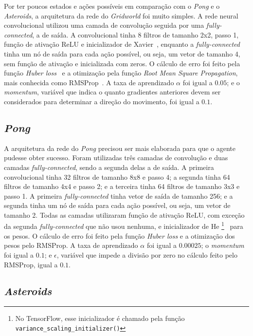 Por ter poucos estados e ações possíveis em comparação com o \textit{Pong} e o \textit{Asteroids}, a arquitetura da rede do \textit{Gridworld} foi muito simples.
A rede neural convolucional utilizou uma camada de convolução seguida por uma \textit{fully-connected}, a de saída.
A convolucional tinha 8 filtros de tamanho 2x2, passo 1, função de ativação ReLU e inicializador de Xavier~\cite{pmlr-v9-glorot10a}, enquanto a \textit{fully-connected} tinha um nó de saída para cada ação possível, ou seja, um vetor de tamanho 4, sem função de ativação e inicializada com zeros.
O cálculo de erro foi feito pela função \textit{Huber loss}~\cite{huber_loss} e a otimização pela função \textit{Root Mean Square Propagation}, mais conhecida como RMSProp~\cite{rmsprop}.
A taxa de aprendizado $\alpha$ foi igual a $0.05$;
e o \textit{momentum}, variável que indica o quanto gradientes anteriores devem ser considerados para determinar a direção do movimento, foi igual a $0.1$.

\subsection{\textit{Pong}}
\label{sec:arq_pong}

A arquitetura da rede do \textit{Pong} precisou ser mais elaborada para que o agente pudesse obter sucesso.
Foram utilizadas três camadas de convolução e duas camadas \textit{fully-connected}, sendo a segunda delas a de saída.
A primeira convolucional tinha 32 filtros de tamanho 8x8 e passo 4; a segunda tinha 64 filtros de tamanho 4x4 e passo 2; e a terceira tinha 64 filtros de tamanho 3x3 e passo 1.
A primeira \textit{fully-connected} tinha vetor de saída de tamanho 256; e a segunda tinha um nó de saída para cada ação possível, ou seja, um vetor de tamanho 2.
Todas as camadas utilizaram função de ativação ReLU, com exceção da segunda \textit{fully-connected} que não usou nenhuma, e inicializador de He \footnote{No TensorFlow, esse inicializador é chamado pela função \texttt{variance\_scaling\_initializer()}}~\cite{DBLP:journals/corr/HeZR015} para os pesos.
O cálculo de erro foi feito pela função \textit{Huber loss} e a otimização dos pesos pelo RMSProp.
A taxa de aprendizado $\alpha$ foi igual a $0.00025$;
o \textit{momentum} foi igual a $0.1$;
e $\epsilon$, variável que impede a divisão por zero no cálculo feito pelo RMSProp, igual a $0.1$.

\subsection{\textit{Asteroids}}
\label{sec:arq_asteroids}

